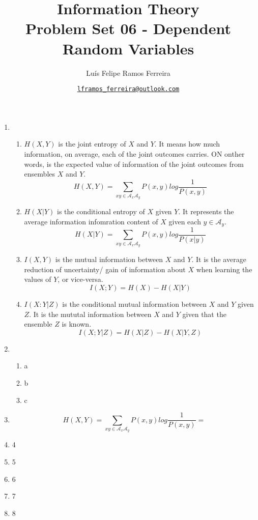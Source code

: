 \documentclass{article}
\title{Information Theory \\ \large Problem Set 06 - Dependent Random Variables}
\author{Luís Felipe Ramos Ferreira}
\date{\href{mailto:lframos\_ferreira@outlook.com}{\texttt{lframos\_ferreira@outlook.com}}
}
\begin{document}
\maketitle

\begin{enumerate}
	\item \begin{enumerate}
		      \item \(H(X, Y)\) is the joint entropy of \(X\) and \(Y\). It means how much information, on average, each of the joint outcomes carries. ON onther words, is the expected value of information of the joint outcomes from ensembles \(X\) and \(Y\).
		            \[H(X, Y) = \sum_{xy \in \mathcal{A}_x\mathcal{A}_y} P(x, y) log \frac{1}{P(x, y)}\]
		      \item \(H(X | Y)\) is the conditional entropy of \(X\) given \(Y\). It represents the average information infomration content of \(X\) given each \(y \in \mathcal{A}_y\).
		            \[H(X | Y) = \sum_{xy \in \mathcal{A}_x\mathcal{A}_y} P(x, y) log \frac{1}{P(x | y)}\]
		      \item \(I(X, Y)\) is the mutual information between \(X\) and \(Y\). It is the average reduction of uncertainty/ gain of information about \(X\) when learning the values of \(Y\), or vice-versa.
		            \[I(X; Y) = H(X) - H(X | Y) \]
		      \item \(I(X: Y | Z)\) is the conditional mutual information between \(X\) and \(Y\) given \(Z\). It is the mututal information between \(X\) and \(Y\) given that the ensemble \(Z\) is known.
		            \[I(X; Y | Z) = H(X | Z) - H(X | Y, Z)\]
	      \end{enumerate}

	\item \begin{enumerate}
		      \item a
		      \item b
		      \item c
	      \end{enumerate}

	\item 
        \[H(X, Y) = \sum_{xy \in \mathcal{A}_x \mathcal{A}_y} P(x, y) log \frac{1}{P(x, y)} = \]
	\item 4
	\item 5
	\item 6
	\item 7
	\item 8
\end{enumerate}
\end{document}
